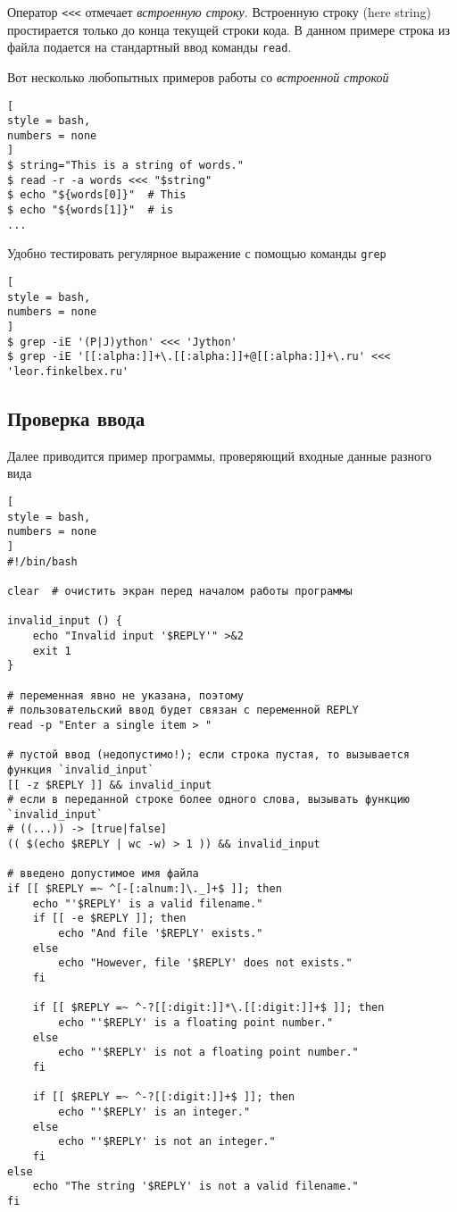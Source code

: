 \documentclass[%
	11pt,
	a4paper,
	utf8,
		]{article}
\begin{document}
Оператор \verb|<<<| отмечает \emph{встроенную строку}. Встроенную строку (here string) простирается только до конца текущей строки кода. В данном примере строка из файла подается на стандартный ввод команды \texttt{read}.

Вот несколько любопытных примеров работы со \emph{встроенной строкой}
\begin{lstlisting}[
style = bash,
numbers = none
]
$ string="This is a string of words."
$ read -r -a words <<< "$string"
$ echo "${words[0]}"  # This
$ echo "${words[1]}"  # is
...
\end{lstlisting}

Удобно тестировать регулярное выражение с помощью команды \texttt{grep}
\begin{lstlisting}[
style = bash,
numbers = none
]
$ grep -iE '(P|J)ython' <<< 'Jython'
$ grep -iE '[[:alpha:]]+\.[[:alpha:]]+@[[:alpha:]]+\.ru' <<< 'leor.finkelbex.ru'
\end{lstlisting}

\subsection{Проверка ввода}

Далее приводится пример программы, проверяющий входные данные разного вида
\begin{lstlisting}[
style = bash,
numbers = none
]
#!/bin/bash

clear  # очистить экран перед началом работы программы

invalid_input () {
    echo "Invalid input '$REPLY'" >&2
    exit 1
}

# переменная явно не указана, поэтому
# пользовательский ввод будет связан с переменной REPLY
read -p "Enter a single item > "

# пустой ввод (недопустимо!); если строка пустая, то вызывается функция `invalid_input`
[[ -z $REPLY ]] && invalid_input
# если в переданной строке более одного слова, вызывать функцию `invalid_input`
# ((...)) -> [true|false]
(( $(echo $REPLY | wc -w) > 1 )) && invalid_input

# введено допустимое имя файла
if [[ $REPLY =~ ^[-[:alnum:]\._]+$ ]]; then
    echo "'$REPLY' is a valid filename."
    if [[ -e $REPLY ]]; then
        echo "And file '$REPLY' exists."
    else
        echo "However, file '$REPLY' does not exists."
    fi

    if [[ $REPLY =~ ^-?[[:digit:]]*\.[[:digit:]]+$ ]]; then
        echo "'$REPLY' is a floating point number."
    else
        echo "'$REPLY' is not a floating point number."
    fi

    if [[ $REPLY =~ ^-?[[:digit:]]+$ ]]; then
        echo "'$REPLY' is an integer."
    else
        echo "'$REPLY' is not an integer."
    fi
else
    echo "The string '$REPLY' is not a valid filename."
fi
\end{lstlisting}
\end{document}
